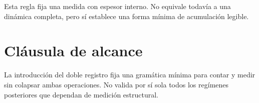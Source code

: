 \begin{observation}
Esta regla fija una medida con espesor interno. No equivale todavía a una dinámica completa, pero sí establece una forma mínima de acumulación legible.
\end{observation}

\section{Cláusula de alcance}
\begin{observation}
La introducción del doble registro fija una gramática mínima para contar y medir sin colapsar ambas operaciones. No valida por sí sola todos los regímenes posteriores que dependan de medición estructural.
\end{observation}

